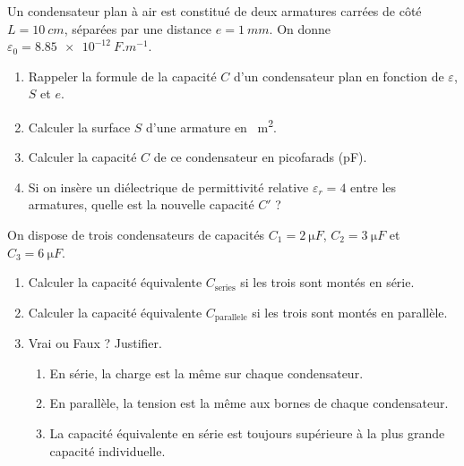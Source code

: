 \documentclass[11pt]{article}
\begin{document}
\begin{exercice}
Un condensateur plan à air est constitué de deux armatures carrées de côté $L = \SI{10}{cm}$, séparées par une distance $e = \SI{1}{mm}$. On donne $\varepsilon_0 = \SI{8,85e-12}{F.m^{-1}}$.
\begin{enumerate}
    \item Rappeler la formule de la capacité $C$ d'un condensateur plan en fonction de $\varepsilon$, $S$ et $e$.
    \item Calculer la surface $S$ d'une armature en \SI{}{m^2}.
    \item Calculer la capacité $C$ de ce condensateur en picofarads (pF).
    \item Si on insère un diélectrique de permittivité relative $\varepsilon_r = 4$ entre les armatures, quelle est la nouvelle capacité $C'$ ?
\end{enumerate}
\end{exercice}

\begin{exercice}
On dispose de trois condensateurs de capacités $C_1 = \SI{2}{\micro F}$, $C_2 = \SI{3}{\micro F}$ et $C_3 = \SI{6}{\micro F}$.
\begin{enumerate}
    \item Calculer la capacité équivalente $C_{\text{series}}$ si les trois sont montés en série.
    \item Calculer la capacité équivalente $C_{\text{parallele}}$ si les trois sont montés en parallèle.
    \item Vrai ou Faux ? Justifier.
    \begin{enumerate}
        \item En série, la charge est la même sur chaque condensateur.
        \item En parallèle, la tension est la même aux bornes de chaque condensateur.
        \item La capacité équivalente en série est toujours supérieure à la plus grande capacité individuelle.
    \end{enumerate}
\end{enumerate}
\end{exercice}
\end{document}
